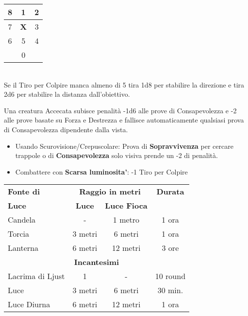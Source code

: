 \documentclass[landscape,10pt,a4paper]{article}
\begin{document}
\begin{multicols}{3}
\begin{dmbox}[title=Armi a spargimento - pagina \pageref{attacchiarmidaspargimento}]
\noindent\begin{tabular}{c|c|c}
8 &1 &2\\
\hline
7 &\textbf{X}& 3\\
\hline
6 &5& 4\\
\hline
&0&\\
\end{tabular}\\

Se il Tiro per Colpire manca almeno di 5 tira 1d8 per stabilire la direzione e tira 2d6 per stabilire la distanza dall'obiettivo.
\end{dmbox}

\begin{dmbox}[title=Visione - pagina \pageref{visioneeluce}]

Una creatura Accecata subisce penalità -1d6 alle prove di Consapevolezza e -2 alle prove basate su Forza e Destrezza e fallisce automaticamente qualsiasi prova di Consapevolezza dipendente dalla vista.

\begin{itemize}[leftmargin=0.5cm,itemsep=-1pt,parsep=0pt]
\item Usando Scurovisione/Crepuscolare: Prova di \textbf{Sopravvivenza} per cercare trappole o di \textbf{Consapevolezza} solo visiva prende un -2 di penalità.
\item Combattere con \textbf{Scarsa luminosita'}: -1 Tiro per Colpire
\end{itemize}
\end{dmbox}

\begin{dmbox}[title=Fonti di Luce - pagina \pageref{fontidiluce}]

\noindent\begin{tabular}{l|cc|c}
\textbf{Fonte di} &\multicolumn{2}{c}{\textbf{Raggio in metri}}& \textbf{Durata}  \\
\textbf{Luce}& \textbf{Luce} & \textbf{Luce Fioca} &\\
Candela & - & 1 metro & 1 ora\\
Torcia & 3 metri & 6 metri & 1 ora\\
Lanterna & 6 metri & 12 metri & 3 ore \\
\multicolumn{4}{c}{\textbf{Incantesimi}}\\
Lacrima di Ljust & 1 & - & 10 round\\
Luce  & 3 metri & 6 metri &30 min. \\
Luce Diurna & 6 metri & 12 metri & 1 ora
\end{tabular}
\end{dmbox}


\end{multicols}
\end{document}
